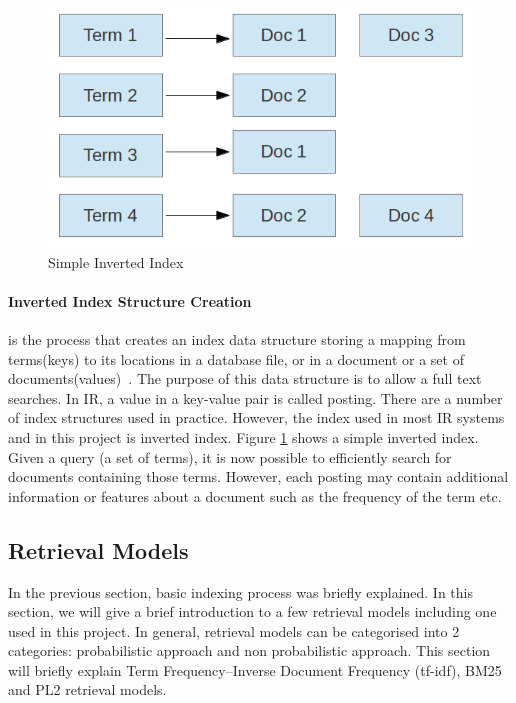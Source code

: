 \begin{figure}
\centering
\includegraphics[scale=0.5]{./figures/invertedIndex.png}
\caption{Simple Inverted Index} \label{fig:invertedIndex} 
\end{figure}

\paragraph{Inverted Index Structure Creation} is the process that creates an index data structure storing a mapping from terms(keys) to its 
locations in a database file, or in a document or a set of documents(values)~\cite{invertedindex}. 
The purpose of this data structure is to allow a full text searches. In IR, a value in a key-value pair is called posting. There are a number of index
structures used in practice. However, the index used in most IR systems and in this project is inverted index.
Figure \ref{fig:invertedIndex} shows a simple inverted index. Given a query (a set of terms), it is now possible to efficiently search for
documents containing those terms. However, each posting may contain additional information or features
about a document such as the frequency of the term etc.

\subsection{Retrieval Models}\label{section:retrievalmodel}
In the previous section, basic indexing process was briefly explained. In this section, we will give a brief introduction to a few retrieval models including one
used in this project. In general, retrieval models can be categorised into 2 categories: probabilistic approach and non probabilistic approach.
This section will briefly explain Term Frequency–Inverse Document Frequency (tf-idf), BM25 and PL2 retrieval models.

